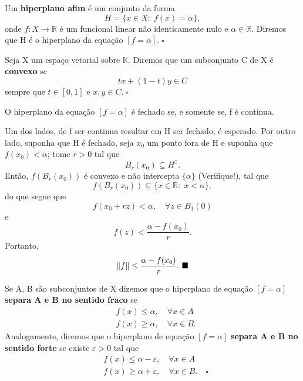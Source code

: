 \documentclass[../functional_analysis.tex]{subfiles}
\begin{document}
\begin{def*}
	Um \textbf{hiperplano afim} é um conjunto da forma
	\[
		H=\{x\in X:\; f(x)=\alpha \},
	\]
	onde \(f:X\rightarrow \mathbb{R}\) é um funcional linear não identicamente nulo e \(\alpha \in \mathbb{R}.\) Diremos que H é o hiperplano da equação \([f=\alpha ].\; \square\)
\end{def*}
\begin{def*}
	Seja X um espaço vetorial sobre \(\mathbb{K}. \) Diremos que um subconjunto C de X é \textbf{convexo} se
	\[
		tx+(1-t)y\in C
	\]
	sempre que \(t\in [0,1]\) e \(x,y\in C.\; \square\)
\end{def*}
\begin{prop*}
	O hiperplano da equação \([f=\alpha ]\) é fechado se, e somente se, f é contínua.
\end{prop*}
\begin{proof*}
	Um dos lados, de f ser continua resultar em H ser fechado, é esperado. Por outro lado, suponha que H é fechado, seja \(x_{0}\) um ponto fora de H e suponha que \(f(x_{0})<\alpha \); tome \(r>0\) tal que
	\[
		B_r(x_{0})\subseteq H ^{\complement}.
	\]
	Então, \(f(B_r(x_{0}))\) é convexo e não intercepta \(\{\alpha \}\) (Verifique!), tal que
	\[
		f(B_r(x_{0}))\subseteq \{x\in \mathbb{R}:\; x<\alpha \},
	\]
	do que segue que
	\[
		f(x_{0}+rz)<\alpha , \quad \forall z\in B_1(0)
	\]
	e
	\[
		f(z)<\frac{\alpha -f(x_{0})}{r}.
	\]
	Portanto,
	\[
		\Vert f \Vert\leq \frac{\alpha - f(x_{0})}{r}. \text{ $\blacksquare$}
	\]
\end{proof*}
\begin{def*}
	Se A, B são subconjuntos de X dizemos que o hiperplano de equação \([f=\alpha ]\) \textbf{separa A e B no sentido fraco} se
	\begin{align*}
		 & f(x)\leq \alpha ,\quad \forall x\in A  \\
		 & f(x)\geq \alpha ,\quad \forall x\in B.
	\end{align*}
	Analogamente, diremos que o hiperplano de equação \([f=\alpha ]\) \textbf{separa A e B no sentido forte} se existe \(\varepsilon >0\) tal que
	\begin{align*}
		 & f(x)\leq \alpha -\varepsilon ,\quad \forall x\in A               \\
		 & f(x)\geq \alpha+\varepsilon  ,\quad \forall x\in B.\quad \square
	\end{align*}
\end{def*}
\end{document}
